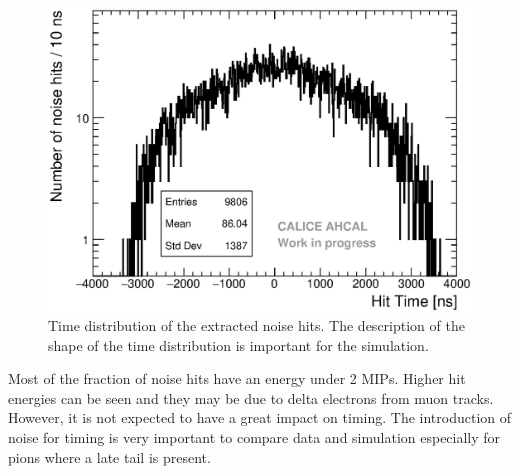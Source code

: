\begin{figure}[htbp!]
	\centering
	\includegraphics[width=0.7\linewidth]{../Thesis_Plots/Timing/Muons/Plots/Noise_Time_Flat.eps}
	\caption{Time distribution of the extracted noise hits. The description of the shape of the time distribution is important for the simulation.} \label{fig:noise_time}
\end{figure}

Most of the fraction of noise hits have an energy under 2 MIPs. Higher hit energies can be seen and they may be due to delta electrons from muon tracks. However, it is not expected to have a great impact on timing. The introduction of noise for timing is very important to compare data and simulation especially for pions where a late tail is present.
